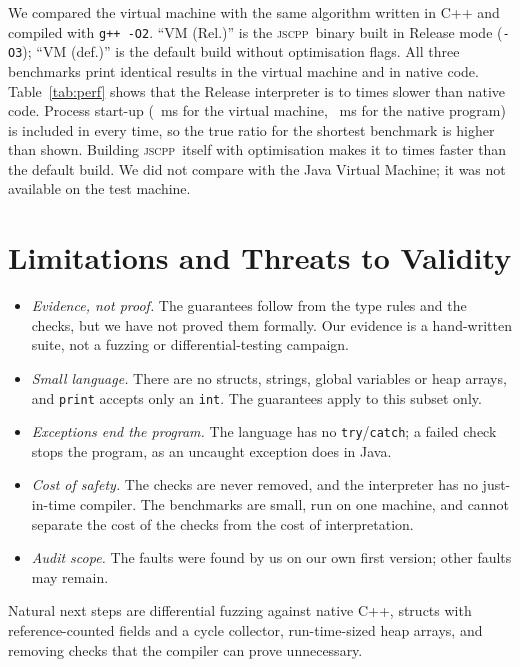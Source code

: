 \documentclass[conference]{IEEEtran}
\newcommand{\jscpp}{\textsc{jscpp}}
\begin{document}
We compared the virtual machine with the same algorithm written in C++ and compiled with \texttt{g++ -O2}.
``VM (Rel.)'' is the \jscpp\ binary built in Release mode (\texttt{-O3}); ``VM (def.)'' is the default build without
optimisation flags. All three benchmarks print identical results in the virtual machine and in native code.
Table~\ref{tab:perf} shows that the Release interpreter is  to  times slower than
native code. Process start-up (~ms for the virtual machine, ~ms
for the native program) is included in every time, so the true ratio for the shortest benchmark is higher than
shown. Building \jscpp\ itself with optimisation makes it  to  times faster than the
default build. We did not compare with the Java Virtual Machine; it was not available on the test machine.

\section{Limitations and Threats to Validity}
\begin{itemize}
\item \emph{Evidence, not proof.} The guarantees follow from the type rules and the checks, but we have not proved
      them formally. Our evidence is a hand-written suite, not a fuzzing or differential-testing campaign.
\item \emph{Small language.} There are no structs, strings, global variables or heap arrays, and \texttt{print}
      accepts only an \texttt{int}. The guarantees apply to this subset only.
\item \emph{Exceptions end the program.} The language has no \texttt{try}/\texttt{catch}; a failed check stops the
      program, as an uncaught exception does in Java.
\item \emph{Cost of safety.} The checks are never removed, and the interpreter has no just-in-time compiler.
      The benchmarks are small, run on one machine, and cannot separate the cost of the checks from the cost of
      interpretation.
\item \emph{Audit scope.} The  faults were found by us on our own first version; other faults may
      remain.
\end{itemize}
Natural next steps are differential fuzzing against native C++, structs with reference-counted fields and a cycle
collector, run-time-sized heap arrays, and removing checks that the compiler can prove unnecessary.
\end{document}

